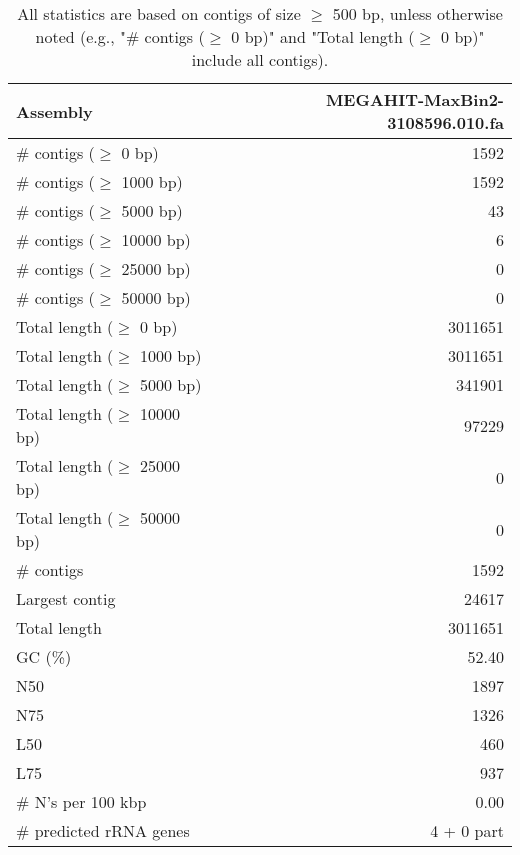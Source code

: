 \documentclass[12pt,a4paper]{article}
\begin{document}
\begin{table}[ht]
\begin{center}
\caption{All statistics are based on contigs of size $\geq$ 500 bp, unless otherwise noted (e.g., "\# contigs ($\geq$ 0 bp)" and "Total length ($\geq$ 0 bp)" include all contigs).}
\begin{tabular}{|l*{1}{|r}|}
\hline
Assembly & MEGAHIT-MaxBin2-3108596.010.fa \\ \hline
\# contigs ($\geq$ 0 bp) & 1592 \\ \hline
\# contigs ($\geq$ 1000 bp) & 1592 \\ \hline
\# contigs ($\geq$ 5000 bp) & 43 \\ \hline
\# contigs ($\geq$ 10000 bp) & 6 \\ \hline
\# contigs ($\geq$ 25000 bp) & 0 \\ \hline
\# contigs ($\geq$ 50000 bp) & 0 \\ \hline
Total length ($\geq$ 0 bp) & 3011651 \\ \hline
Total length ($\geq$ 1000 bp) & 3011651 \\ \hline
Total length ($\geq$ 5000 bp) & 341901 \\ \hline
Total length ($\geq$ 10000 bp) & 97229 \\ \hline
Total length ($\geq$ 25000 bp) & 0 \\ \hline
Total length ($\geq$ 50000 bp) & 0 \\ \hline
\# contigs & 1592 \\ \hline
Largest contig & 24617 \\ \hline
Total length & 3011651 \\ \hline
GC (\%) & 52.40 \\ \hline
N50 & 1897 \\ \hline
N75 & 1326 \\ \hline
L50 & 460 \\ \hline
L75 & 937 \\ \hline
\# N's per 100 kbp & 0.00 \\ \hline
\# predicted rRNA genes & 4 + 0 part \\ \hline
\end{tabular}
\end{center}
\end{table}
\end{document}
